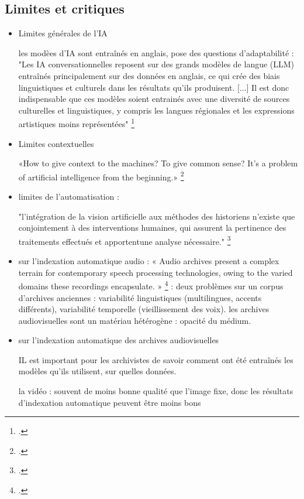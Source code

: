 \subsection{Limites et critiques}

\begin{itemize}
	
	\item Limites générales de l'IA
	
les modèes d'IA sont entraînés en anglais, pose des questions d'adaptabilité : "Les IA conversationnelles reposent sur des grands modèles de langue (LLM) entraînés principalement sur des données en anglais, ce qui crée des biais linguistiques et culturels dans les résultats qu'ils produisent. [...] Il est donc indispensable que ces modèles soient entrainés avec une diversité de sources culturelles et
linguistiques, y compris les langues régionales et les expressions artistiques moins représentées" \footcite{2025a}
	
	\item Limites contextuelles 

«How to give context to the machines? To give common sense? It's a problem of artificial intelligence from the beginning.»
\footcite{2021}

\item limites de l'automatisation :
 
"l’intégration de la vision artificielle aux méthodes des historiens n’existe que conjointement à des
interventions humaines, qui assurent la pertinence des traitements effectués et apportentune analyse nécessaire." \footcite{norindr2023}

\item sur l'indexation automatique audio :
« Audio archives present a complex terrain for contemporary speech processing technologies, owing to the varied domains these recordings encapsulate. » \footcite{sullivan2025} : deux problèmes sur un corpus d'archives anciennes : variabilité linguistiques (multilingues, accents différents), variabilité temporelle (vieillissement des voix).
les archives audiovisuelles sont un matériau hétérogène : opacité du médium. 

\item sur l'indexation automatique des archives audiovisuelles 

IL est important pour les archivistes de savoir comment ont été entraînés les modèles qu'ils utilisent, sur quelles données.

la vidéo : souvent de moins bonne qualité que l'image fixe, donc les résultats d'indexation automatique peuvent être moins bons


\end{itemize}

